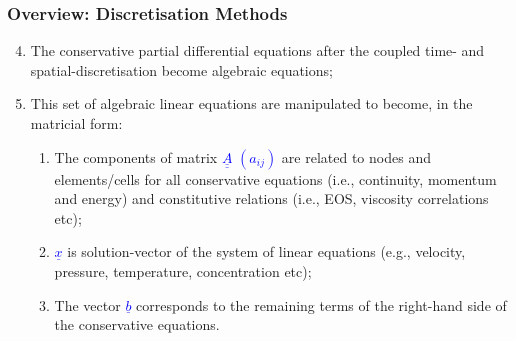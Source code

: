 \documentclass[10pt,compress,handout,ignorenonframetext]{beamer}
\begin{document}
\begin{frame}
 \frametitle{Overview: Discretisation Methods} 
\begin{enumerate}
  \setcounter{enumi}{3}
  \item <1-> The conservative partial differential equations after the coupled time- and spatial-discretisation become algebraic equations;
  \item <2-> This set of algebraic linear equations are manipulated to become, in the matricial form:
      \begin{enumerate}
         \item<3-> The components of matrix \textcolor{blue}{$\underline{\underline{A}}$ $\left(a_{ij}\right)$} are related to nodes and elements/cells for all conservative equations (i.e., continuity, momentum and energy) and constitutive relations (i.e., EOS, viscosity correlations etc);
         \item<4-> \textcolor{blue}{$\underline{x}$} is solution-vector of the system of linear equations (e.g., velocity, pressure, temperature, concentration etc);
         \item <5-> The vector \textcolor{blue}{$\underline{b}$} corresponds to the remaining terms of the right-hand side of the conservative equations.
      \end{enumerate}
\end{enumerate}

\end{frame}
\end{document}
